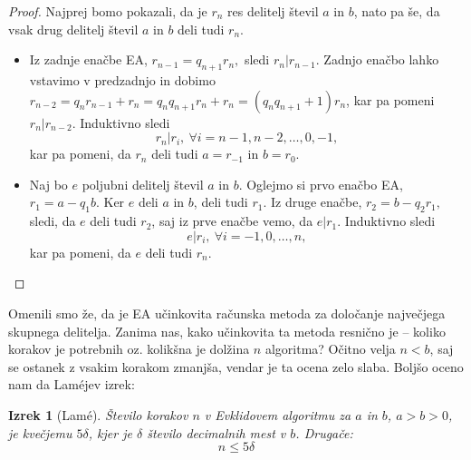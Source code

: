\documentclass[12pt, a4paper]{article}
\newtheorem{izr}{Izrek}
\begin{document}
\begin{proof}
Najprej bomo pokazali, da je $r_n$ res delitelj števil $a$ in $b$, nato pa še, da vsak drug delitelj števil $a$ in $b$ deli tudi $r_n$.
\begin{itemize}
\item Iz zadnje enačbe EA, $r_{n-1} = q_{n+1}r_n,$ sledi $r_n|r_{n-1}$. Zadnjo enačbo lahko vstavimo v predzadnjo in dobimo
$r_{n-2} = q_n r_{n-1} + r_n = q_n q_{n+1}r_n + r_n= (q_n q_{n+1}+1)r_n$, kar pa pomeni $r_n | r_{n-2}$. Induktivno sledi
$$r_n | r_i,\ \forall i=n-1,n-2,\dots,0,-1,$$
kar pa pomeni, da $r_n$ deli tudi $a=r_{-1}$ in $b=r_0$.
\item Naj bo $e$ poljubni delitelj števil $a$ in $b$. Oglejmo si prvo enačbo EA, $r_1 = a - q_1 b$. Ker $e$ deli $a$ in $b$, deli tudi $r_1$. Iz druge enačbe, $r_2 = b - q_2 r_1,$ sledi, da $e$ deli tudi $r_2$, saj iz prve enačbe vemo, da $e|r_1$. Induktivno sledi
$$e|r_i,\ \forall i=-1,0,\dots,n,$$
kar pa pomeni, da $e$ deli tudi $r_n$.
\end{itemize}
\end{proof}

Omenili smo že, da je EA učinkovita računska metoda za določanje največjega skupnega delitelja. Zanima nas, kako učinkovita ta metoda resnično je --  koliko korakov je potrebnih oz. kolikšna je dolžina $n$ algoritma? Očitno velja $n<b$, saj se ostanek z vsakim korakom zmanjša, vendar je ta ocena zelo slaba. Boljšo oceno nam da Lam\'ejev izrek:

\begin{izr}[Lam\'e]
Število korakov $n$ v Evklidovem algoritmu za $a$ in $b$, \mbox{$a>b>0$}, je kvečjemu $5\delta$, kjer je $\delta$ število decimalnih mest v $b$. Drugače: $$n\leq 5\delta$$
\end{izr}
\end{document}

